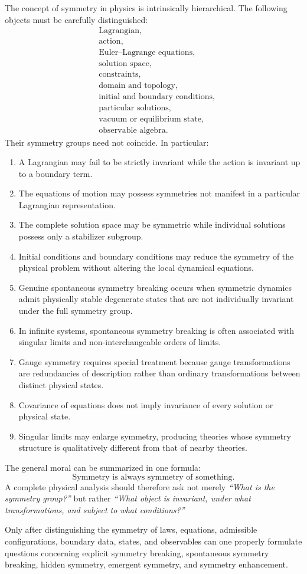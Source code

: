 The concept of symmetry in physics is intrinsically hierarchical.
The following objects must be carefully distinguished:
\[
\begin{aligned}
&\text{Lagrangian},\\
&\text{action},\\
&\text{Euler--Lagrange equations},\\
&\text{solution space},\\
&\text{constraints},\\
&\text{domain and topology},\\
&\text{initial and boundary conditions},\\
&\text{particular solutions},\\
&\text{vacuum or equilibrium state},\\
&\text{observable algebra}.
\end{aligned}
\]
Their symmetry groups need not coincide.
In particular:
\begin{enumerate}
\item A Lagrangian may fail to be strictly invariant while the action is
    invariant up to a boundary term.
\item The equations of motion may possess symmetries not manifest in a
    particular Lagrangian representation.
\item The complete solution space may be symmetric while individual solutions
    possess only a stabilizer subgroup.
\item Initial conditions and boundary conditions may reduce the symmetry of the
    physical problem without altering the local dynamical equations.
\item Genuine spontaneous symmetry breaking occurs when symmetric dynamics
    admit physically stable degenerate states that are not individually
        invariant under the full symmetry group.
\item In infinite systems, spontaneous symmetry breaking is often associated
    with singular limits and non-interchangeable orders of limits.
\item Gauge symmetry requires special treatment because gauge transformations
    are redundancies of description rather than ordinary transformations
        between distinct physical states.
\item Covariance of equations does not imply invariance of every solution or
    physical state.
\item Singular limits may enlarge symmetry, producing theories whose symmetry
    structure is qualitatively different from that of nearby theories.
\end{enumerate}
The general moral can be summarized in one formula:
\[
\boxed{
\text{Symmetry is always symmetry of something.}
}
\]
A complete physical analysis should therefore ask not merely
\emph{``What is the symmetry group?''} but rather
\emph{``What object is invariant, under what transformations, and subject 
to what conditions?''}

Only after distinguishing the symmetry of laws, equations, admissible
configurations, boundary data, states, and observables can one properly
formulate questions concerning explicit symmetry breaking, spontaneous symmetry
breaking, hidden symmetry, emergent symmetry, and symmetry enhancement.
